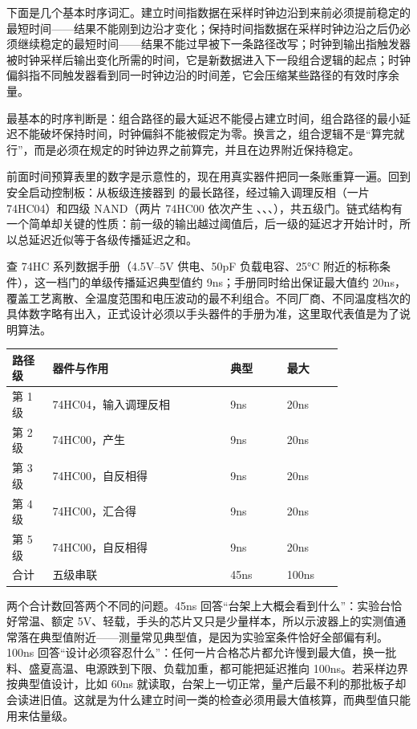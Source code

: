 下面是几个基本时序词汇。建立时间指数据在采样时钟边沿到来前必须提前稳定的最短时间——结果不能刚到边沿才变化；保持时间指数据在采样时钟边沿之后仍必须继续稳定的最短时间——结果不能过早被下一条路径改写；时钟到输出指触发器被时钟采样后输出变化所需的时间，它是新数据进入下一段组合逻辑的起点；时钟偏斜指不同触发器看到同一时钟边沿的时间差，它会压缩某些路径的有效时序余量。

最基本的时序判断是：组合路径的最大延迟不能侵占建立时间，组合路径的最小延迟不能破坏保持时间，时钟偏斜不能被假定为零。换言之，组合逻辑不是“算完就行”，而是必须在规定的时钟边界之前算完，并且在边界附近保持稳定。

前面时间预算表里的数字是示意性的，现在用真实器件把同一条账重算一遍。回到安全启动控制板：从板级连接器到  的最长路径，经过输入调理反相（一片 74HC04）和四级 NAND（两片 74HC00 依次产生 、、、），共五级门。链式结构有一个简单却关键的性质：前一级的输出越过阈值后，后一级的延迟才开始计时，所以总延迟近似等于各级传播延迟之和。

查 74HC 系列数据手册（4.5V–5V 供电、50pF 负载电容、25°C 附近的标称条件），这一档门的单级传播延迟典型值约 9ns；手册同时给出保证最大值约 20ns，覆盖工艺离散、全温度范围和电压波动的最不利组合。不同厂商、不同温度档次的具体数字略有出入，正式设计必须以手头器件的手册为准，这里取代表值是为了说明算法。

\begin{longtable}{L{0.1\linewidth}L{0.44\linewidth}L{0.14\linewidth}L{0.14\linewidth}}
\toprule
路径级 & 器件与作用 & 典型 & 最大 \\
\midrule
第 1 级 & 74HC04，输入调理反相 & 9ns & 20ns \\\tablerowrule
第 2 级 & 74HC00，产生  & 9ns & 20ns \\\tablerowrule
第 3 级 & 74HC00，自反相得  & 9ns & 20ns \\\tablerowrule
第 4 级 & 74HC00，汇合得  & 9ns & 20ns \\\tablerowrule
第 5 级 & 74HC00，自反相得  & 9ns & 20ns \\\tablerowrule
合计 & 五级串联 & 45ns & 100ns \\
\bottomrule
\end{longtable}

两个合计数回答两个不同的问题。45ns 回答“台架上大概会看到什么”：实验台恰好常温、额定 5V、轻载，手头的芯片又只是少量样本，所以示波器上的实测值通常落在典型值附近——测量常见典型值，是因为实验室条件恰好全部偏有利。100ns 回答“设计必须容忍什么”：任何一片合格芯片都允许慢到最大值，换一批料、盛夏高温、电源跌到下限、负载加重，都可能把延迟推向 100ns。若采样边界按典型值设计，比如 60ns 就读取，台架上一切正常，量产后最不利的那批板子却会读进旧值。这就是为什么建立时间一类的检查必须用最大值核算，而典型值只能用来估量级。

